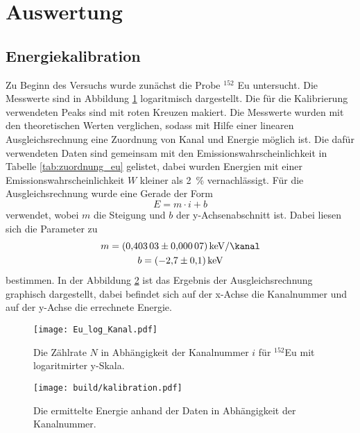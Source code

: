 \newpage
\section{Auswertung}
\label{sec:Auswertung}

\subsection{Energiekalibration}
\label{sec:Energiekalibration}
Zu Beginn des Versuchs wurde zunächst die Probe ${}^{152}$ Eu untersucht. Die Messwerte
sind in Abbildung \ref{fig:Eu_log_Kanal} logaritmisch dargestellt.
Die für die Kalibrierung verwendeten Peaks sind mit roten Kreuzen makiert. Die Messwerte
wurden mit den theoretischen Werten verglichen, sodass mit Hilfe einer linearen Ausgleichsrechnung
eine Zuordnung von Kanal und Energie möglich ist. Die dafür verwendeten Daten sind
gemeinsam mit den Emissionswahrscheinlichkeit in Tabelle \ref{tab:zuordnung_eu}
gelistet, dabei wurden Energien mit einer Emissionswahrscheinlichkeit $W$
kleiner als \SI{2}{\percent} vernachlässigt. Für die Ausgleichsrechnung wurde
eine Gerade der Form
\begin{equation}
  E = m \cdot i + b
\end{equation}
verwendet, wobei $m$ die Steigung und $b$ der y-Achsenabschnitt ist. Dabei liesen sich die Parameter zu
\begin{gather}
  m = \SI{0.40303(7)}{\kilo\electronvolt\per\kanal} \\
  b = \SI{-2.7(1)}{\kilo\electronvolt}
\end{gather}
bestimmen.
In der Abbildung \ref{fig:kalibration} ist das Ergebnis der Ausgleichsrechnung graphisch
dargestellt, dabei befindet sich auf der x-Achse die Kanalnummer und auf der
y-Achse die errechnete Energie.

\begin{figure}[htb]
 \centering
 \texttt{[image: Eu\_log\_Kanal.pdf]}
 \caption{Die Zählrate $N$ in Abhängigkeit der Kanalnummer $i$ für ${}^{152}$Eu mit logaritmirter y-Skala.}
 \label{fig:Eu_log_Kanal}
\end{figure}

\begin{figure}[htb]
 \centering
 \texttt{[image: build/kalibration.pdf]}
 \caption{Die ermittelte Energie anhand der Daten in Abhängigkeit der Kanalnummer.}
 \label{fig:kalibration}
\end{figure}




